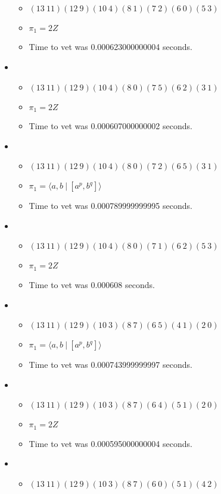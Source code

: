 \documentclass{article}
\begin{document}
\begin{itemize}
\begin{itemize}
      \item $(13\ 11)(12\ 9)(10\ 4)(8\ 1)(7\ 2)(6\ 0)(5\ 3)$
      \item $\pi_1 =2 Z$
      \item Time to vet was 0.000623000000004 seconds.
\end{itemize}
\item \begin{itemize}
      \item $(13\ 11)(12\ 9)(10\ 4)(8\ 0)(7\ 5)(6\ 2)(3\ 1)$
      \item $\pi_1 =2 Z$
      \item Time to vet was 0.000607000000002 seconds.
\end{itemize}
\item \begin{itemize}
      \item $(13\ 11)(12\ 9)(10\ 4)(8\ 0)(7\ 2)(6\ 5)(3\ 1)$
      \item $\pi_1 = \langle a,b\ |\ [a^p,b^q]\rangle$
      \item Time to vet was 0.000789999999995 seconds.
\end{itemize}
\item \begin{itemize}
      \item $(13\ 11)(12\ 9)(10\ 4)(8\ 0)(7\ 1)(6\ 2)(5\ 3)$
      \item $\pi_1 =2 Z$
      \item Time to vet was 0.000608 seconds.
\end{itemize}
\item \begin{itemize}
      \item $(13\ 11)(12\ 9)(10\ 3)(8\ 7)(6\ 5)(4\ 1)(2\ 0)$
      \item $\pi_1 = \langle a,b\ |\ [a^p,b^q]\rangle$
      \item Time to vet was 0.000743999999997 seconds.
\end{itemize}
\item \begin{itemize}
      \item $(13\ 11)(12\ 9)(10\ 3)(8\ 7)(6\ 4)(5\ 1)(2\ 0)$
      \item $\pi_1 =2 Z$
      \item Time to vet was 0.000595000000004 seconds.
\end{itemize}
\item \begin{itemize}
      \item $(13\ 11)(12\ 9)(10\ 3)(8\ 7)(6\ 0)(5\ 1)(4\ 2)$

\end{itemize}
\end{itemize}
\end{document}
